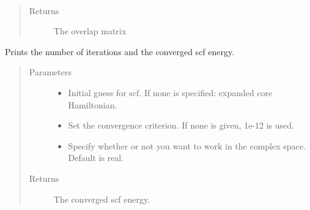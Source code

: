 \documentclass[letterpaper,10pt,english]{sphinxmanual}
\begin{document}
\begin{fulllineitems}
\begin{fulllineitems}
\label{\detokenize{GHF:hf.HartreeFock.GHF.MF.get_ovlp}}~\begin{quote}\begin{description}
\item[{Returns}] \leavevmode
The overlap matrix

\end{description}\end{quote}

\end{fulllineitems}


\begin{fulllineitems}
\label{\detokenize{GHF:hf.HartreeFock.GHF.MF.get_scf_solution}}
Prints the number of iterations and the converged scf energy.
\begin{quote}\begin{description}
\item[{Parameters}] \leavevmode\begin{itemize}
\item {} 
 \textendash{} Initial guess for scf. If none is specified: expanded core Hamiltonian.

\item {} 
 \textendash{} Set the convergence criterion. If none is given, 1e-12 is used.

\item {} 
 \textendash{} Specify whether or not you want to work in the complex space. Default is real.

\end{itemize}

\item[{Returns}] \leavevmode
The converged scf energy.

\end{description}\end{quote}

\end{fulllineitems}


\end{fulllineitems}
\end{document}
